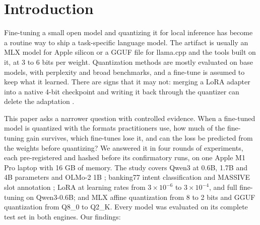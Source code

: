 \documentclass[11pt,letterpaper]{article}
\begin{document}
\section{Introduction}
\label{sec:intro}

Fine-tuning a small open model and quantizing it for local inference has become a routine way to ship a task-specific language model. The artifact is usually an MLX model for Apple silicon \citep{mlx2023} or a GGUF file for llama.cpp \citep{llamacpp} and the tools built on it, at 3 to 6 bits per weight. Quantization methods are mostly evaluated on base models, with perplexity and broad benchmarks, and a fine-tune is assumed to keep what it learned. There are signs that it may not: merging a LoRA adapter into a native 4-bit checkpoint and writing it back through the quantizer can delete the adaptation \citep{li2026scaleqlora}.

This paper asks a narrower question with controlled evidence. When a fine-tuned model is quantized with the formats practitioners use, how much of the fine-tuning gain survives, which fine-tunes lose it, and can the loss be predicted from the weights before quantizing? We answered it in four rounds of experiments, each pre-registered and hashed before its confirmatory runs, on one Apple M1 Pro laptop with 16 GB of memory. The study covers Qwen3 at 0.6B, 1.7B and 4B parameters \citep{qwen3} and OLMo-2 1B \citep{olmo2}; banking77 intent classification \citep{casanueva2020banking77} and MASSIVE slot annotation \citep{fitzgerald2023massive}; LoRA \citep{hu2022lora} at learning rates from $3\times10^{-6}$ to $3\times10^{-4}$, and full fine-tuning on Qwen3-0.6B; and MLX affine quantization from 8 to 2 bits and GGUF quantization from Q8\_0 to Q2\_K. Every model was evaluated on its complete test set in both engines. Our findings:
\end{document}
